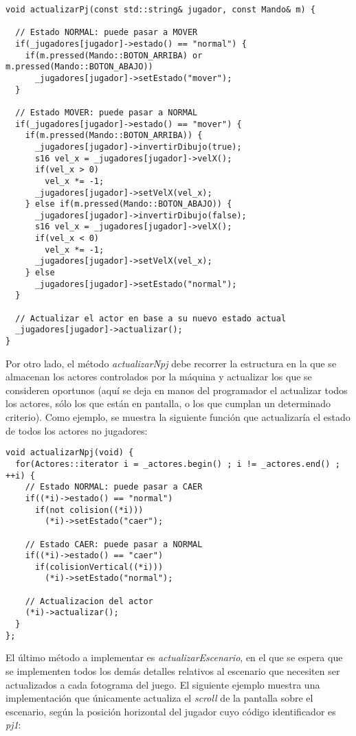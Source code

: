 \begin{lstlisting}[style=C++]
void actualizarPj(const std::string& jugador, const Mando& m) {

  // Estado NORMAL: puede pasar a MOVER
  if(_jugadores[jugador]->estado() == "normal") {
    if(m.pressed(Mando::BOTON_ARRIBA) or m.pressed(Mando::BOTON_ABAJO))
      _jugadores[jugador]->setEstado("mover");
  }

  // Estado MOVER: puede pasar a NORMAL
  if(_jugadores[jugador]->estado() == "mover") {
    if(m.pressed(Mando::BOTON_ARRIBA)) {
      _jugadores[jugador]->invertirDibujo(true);
      s16 vel_x = _jugadores[jugador]->velX();
      if(vel_x > 0)
        vel_x *= -1;
      _jugadores[jugador]->setVelX(vel_x);
    } else if(m.pressed(Mando::BOTON_ABAJO)) {
      _jugadores[jugador]->invertirDibujo(false);
      s16 vel_x = _jugadores[jugador]->velX();
      if(vel_x < 0)
        vel_x *= -1;
      _jugadores[jugador]->setVelX(vel_x);
    } else
      _jugadores[jugador]->setEstado("normal");
  }

  // Actualizar el actor en base a su nuevo estado actual
  _jugadores[jugador]->actualizar();
}
\end{lstlisting}

Por otro lado, el método \emph{actualizarNpj} debe recorrer la estructura en la que se almacenan los actores controlados por la máquina y actualizar los que se consideren oportunos (aquí se deja en manos del programador el actualizar todos los actores, sólo los que están en pantalla, o los que cumplan un determinado criterio). Como ejemplo, se muestra la siguiente función que actualizaría el estado de todos los actores no jugadores:

\begin{lstlisting}[style=C++]
void actualizarNpj(void) {
  for(Actores::iterator i = _actores.begin() ; i != _actores.end() ; ++i) {
    // Estado NORMAL: puede pasar a CAER
    if((*i)->estado() == "normal")
      if(not colision((*i)))
        (*i)->setEstado("caer");

    // Estado CAER: puede pasar a NORMAL
    if((*i)->estado() == "caer")
      if(colisionVertical((*i)))
        (*i)->setEstado("normal");

    // Actualizacion del actor
    (*i)->actualizar();
  }
};
\end{lstlisting}

El último método a implementar es \emph{actualizarEscenario}, en el que se espera que se implementen todos los demás detalles relativos al escenario que necesiten ser actualizados a cada fotograma del juego. El siguiente ejemplo muestra una implementación que únicamente actualiza el \emph{scroll} de la pantalla sobre el escenario, según la posición horizontal del jugador cuyo código identificador es \emph{pj1}:

